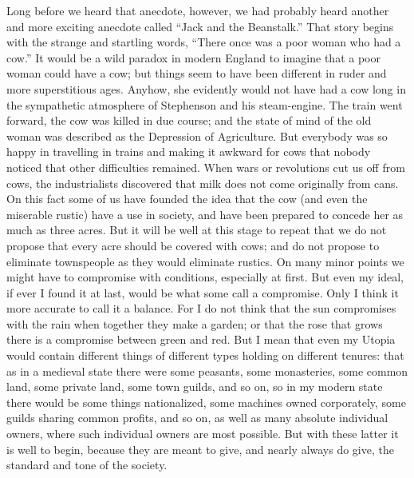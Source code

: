 \documentclass{book}
\begin{document}
Long before we heard that anecdote, however, we had probably heard another and more exciting anecdote called “Jack and the Beanstalk.” That story begins with the strange and startling words, “There once was a poor woman who had a cow.” It would be a wild paradox in modern England to imagine that a poor woman could have a cow; but things seem to have been different in ruder and more superstitious ages. Anyhow, she evidently would not have had a cow long in the sympathetic atmosphere of Stephenson and his steam-engine. The train went forward, the cow was killed in due course; and the state of mind of the old woman was described as the Depression of Agriculture. But everybody was so happy in travelling in trains and making it awkward for cows that nobody noticed that other difficulties remained. When wars or revolutions cut us off from cows, the industrialists discovered that milk does not come originally from cans. On this fact some of us have founded the idea that the cow (and even the miserable rustic) have a use in society, and have been prepared to concede her as much as three acres. But it will be well at this stage to repeat that we do not propose that every acre should be covered with cows; and do not propose to eliminate townspeople as they would eliminate rustics. On many minor points we might have to compromise with conditions, especially at first. But even my ideal, if ever I found it at last, would be what some call a compromise. Only I think it more accurate to call it a balance. For I do not think that the sun compromises with the rain when together they make a garden; or that the rose that grows there is a compromise between green and red. But I mean that even my Utopia would contain different things of different types holding on different tenures: that as in a medieval state there were some peasants, some monasteries, some common land, some private land, some town guilds, and so on, so in my modern state there would be some things nationalized, some machines owned corporately, some guilds sharing common profits, and so on, as well as many absolute individual owners, where such individual owners are most possible. But with these latter it is well to begin, because they are meant to give, and nearly always do give, the standard and tone of the society.
\end{document}

